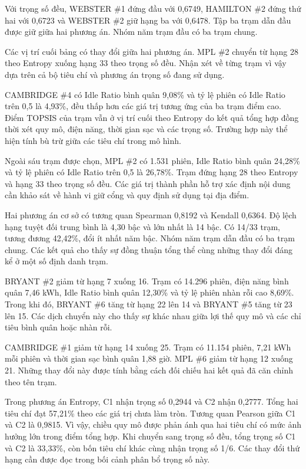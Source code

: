 \documentclass[conference,a4paper]{IEEEtran}
\begin{document}
Với trọng số đều, WEBSTER \#1 đứng đầu với 0,6749, HAMILTON \#2 đứng thứ hai với 0,6723 và WEBSTER \#2 giữ hạng ba với 0,6478. Tập ba trạm dẫn đầu được giữ giữa hai phương án. Nhóm năm trạm đầu có ba trạm chung.

Các vị trí cuối bảng có thay đổi giữa hai phương án. MPL \#2 chuyển từ hạng 28 theo Entropy xuống hạng 33 theo trọng số đều. Nhận xét về từng trạm vì vậy dựa trên cả bộ tiêu chí và phương án trọng số đang sử dụng.

CAMBRIDGE \#4 có Idle Ratio bình quân 9,08\% và tỷ lệ phiên có Idle Ratio trên 0,5 là 4,93\%, đều thấp hơn các giá trị tương ứng của ba trạm điểm cao. Điểm TOPSIS của trạm vẫn ở vị trí cuối theo Entropy do kết quả tổng hợp đồng thời xét quy mô, điện năng, thời gian sạc và các trọng số. Trường hợp này thể hiện tính bù trừ giữa các tiêu chí trong mô hình.

Ngoài sáu trạm được chọn, MPL \#2 có 1.531 phiên, Idle Ratio bình quân 24,28\% và tỷ lệ phiên có Idle Ratio trên 0,5 là 26,78\%. Trạm đứng hạng 28 theo Entropy và hạng 33 theo trọng số đều. Các giá trị thành phần hỗ trợ xác định nội dung cần khảo sát về hành vi giữ cổng và quy định sử dụng tại địa điểm.

Hai phương án cơ sở có tương quan Spearman 0,8192 và Kendall 0,6364. Độ lệch hạng tuyệt đối trung bình là 4,30 bậc và lớn nhất là 14 bậc. Có 14/33 trạm, tương đương 42,42\%, đổi ít nhất năm bậc. Nhóm năm trạm dẫn đầu có ba trạm chung. Các kết quả cho thấy sự đồng thuận tổng thể cùng những thay đổi đáng kể ở một số định danh trạm.

BRYANT \#2 giảm từ hạng 7 xuống 16. Trạm có 14.296 phiên, điện năng bình quân 7,46 kWh, Idle Ratio bình quân 12,30\% và tỷ lệ phiên nhàn rỗi cao 8,69\%. Trong khi đó, BRYANT \#6 tăng từ hạng 22 lên 14 và BRYANT \#5 tăng từ 23 lên 15. Các dịch chuyển này cho thấy sự khác nhau giữa lợi thế quy mô và các chỉ tiêu bình quân hoặc nhàn rỗi.

CAMBRIDGE \#1 giảm từ hạng 14 xuống 25. Trạm có 11.154 phiên, 7,21 kWh mỗi phiên và thời gian sạc bình quân 1,88 giờ. MPL \#6 giảm từ hạng 12 xuống 21. Những thay đổi này được tính bằng cách đối chiếu hai kết quả đã căn chỉnh theo tên trạm.

Trong phương án Entropy, C1 nhận trọng số 0,2944 và C2 nhận 0,2777. Tổng hai tiêu chí đạt 57,21\% theo các giá trị chưa làm tròn. Tương quan Pearson giữa C1 và C2 là 0,9815. Vì vậy, chiều quy mô được phản ánh qua hai tiêu chí có mức ảnh hưởng lớn trong điểm tổng hợp. Khi chuyển sang trọng số đều, tổng trọng số C1 và C2 là 33,33\%, còn bốn tiêu chí khác cùng nhận trọng số 1/6. Các thay đổi thứ hạng cần được đọc trong bối cảnh phân bổ trọng số này.
\end{document}
